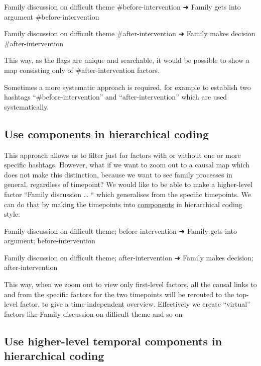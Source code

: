 \documentclass[
]{book}
\begin{document}
Family discussion on difficult theme \#before-intervention ➜ Family gets into argument \#before-intervention

Family discussion on difficult theme \#after-intervention ➜ Family makes decision \#after-intervention

This way, as the flags are unique and searchable, it would be possible to show a map consisting only of \#after-intervention factors.

Sometimes a more systematic approach is required, for example to establish two hashtags ``\#before-intervention'' and ``after-intervention'' which are used systematically.

\hypertarget{use-components-in-hierarchical-coding}{%
\subsection{Use components in hierarchical coding}\label{use-components-in-hierarchical-coding}}

This approach allows us to filter just for factors with or without one or more specific hashtags. However, what if we want to zoom out to a causal map which does not make this distinction, because we want to see family processes in general, regardless of timepoint? We would like to be able to make a higher-level factor ``Family discussion \ldots{} `` which generalises from the specific timepoints. We can do that by making the timepoints into \href{https://causalmapdocumentation.blot.im/search?q=component}{components} in hierarchical coding style:

Family discussion on difficult theme; before-intervention ➜ Family gets into argument; before-intervention

Family discussion on difficult theme; after-intervention ➜ Family makes decision; after-intervention

This way, when we zoom out to view only first-level factors, all the causal links to and from the specific factors for the two timepoints will be rerouted to the top-level factor, to give a time-independent overview. Effectively we create ``virtual'' factors like Family discussion on difficult theme and so on

\hypertarget{use-higher-level-temporal-components-in-hierarchical-coding}{%
\subsection{Use higher-level temporal components in hierarchical coding}\label{use-higher-level-temporal-components-in-hierarchical-coding}}
\end{document}
